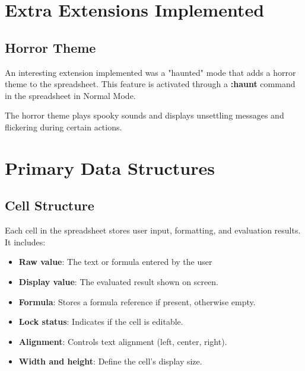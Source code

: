 \documentclass[a4paper,12pt]{article}
\begin{document}
\section{Extra Extensions Implemented}
\subsection{Horror Theme}
An interesting extension implemented was a "haunted" mode that adds a horror theme to the spreadsheet. This feature is activated through a \textbf{:haunt} command in the spreadsheet in Normal Mode.

The horror theme plays spooky sounds and displays unsettling messages and flickering during certain actions.

\section{Primary Data Structures}
\subsection{Cell Structure}
Each cell in the spreadsheet stores user input, formatting, and evaluation results. It includes:
\vspace{-3mm}
\begin{itemize}
    \item \textbf{Raw value}: The text or formula entered by the user
\vspace{-3mm}

\item \textbf{Display value}: The evaluated result shown on screen.
\vspace{-3mm}
\item \textbf{Formula}: Stores a formula reference if present, otherwise empty.
\vspace{-3mm}
\item \textbf{Lock status}: Indicates if the cell is editable.
\vspace{-3mm}
\item \textbf{Alignment}: Controls text alignment (left, center, right).
\vspace{-3mm}
\item \textbf{Width and height}: Define the cell’s display size.
\vspace{-3mm}
\end{itemize}
\end{document}
